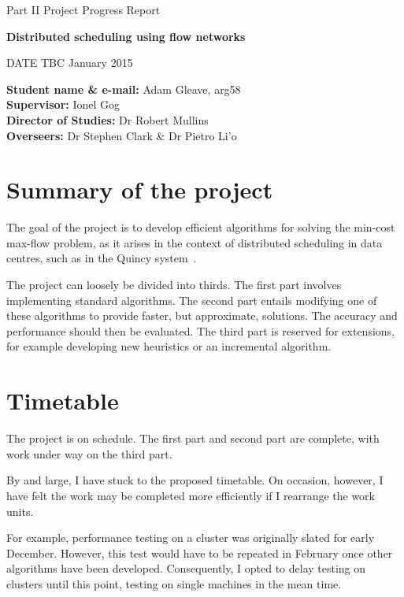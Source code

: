 
\centerline{\Large Part II Project Progress Report}
\vspace{0.1in}
\centerline{\large \textbf{Distributed scheduling using flow networks}}
\vspace{0.1in}
\centerline{DATE TBC January 2015}


\textbf{Student name \& e-mail:} Adam Gleave, arg58 \hfil \\
\textbf{Supervisor:} Ionel Gog \hfil \\
\textbf{Director of Studies:} Dr Robert Mullins \hfil \\
\textbf{Overseers:} Dr Stephen Clark \& Dr Pietro Li\a'o \hfil \\


\section{Summary of the project}
The goal of the project is to develop efficient algorithms for solving the min-cost max-flow problem, as it arises in the context of distributed scheduling in data centres, such as in the Quincy system~\cite{Isard:2009}. 

The project can loosely be divided into thirds. The first part involves implementing standard algorithms. The second part entails modifying one of these algorithms to provide faster, but approximate, solutions. The accuracy and performance should then be evaluated. The third part is reserved for extensions, for example developing new heuristics or an incremental algorithm.

\section{Timetable}
The project is on schedule. The first part and second part are complete, with work under way on the third part. 

By and large, I have stuck to the proposed timetable. On occasion, however, I have felt the work may be completed more efficiently if I rearrange the work units. 

For example, performance testing on a cluster was originally slated for early December. However, this test would have to be repeated in February once other algorithms have been developed. Consequently, I opted to delay testing on clusters until this point, testing on single machines in the mean time.


